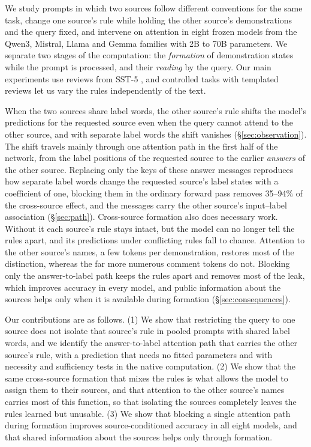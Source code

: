\documentclass[11pt]{article}
\newcommand{\nmodels}{eight}
\begin{document}
We study prompts in which two sources follow different conventions for the same task, change one source's rule while holding the other source's demonstrations and the query fixed, and intervene on attention in \nmodels{} frozen models from the Qwen3, Mistral, Llama and Gemma families with 2B to 70B parameters.
We separate two stages of the computation: the \emph{formation} of demonstration states while the prompt is processed, and their \emph{reading} by the query.
Our main experiments use reviews from SST-5 \citep{socher-etal-2013-recursive}, and controlled tasks with templated reviews let us vary the rules independently of the text.

When the two sources share label words, the other source's rule shifts the model's predictions for the requested source even when the query cannot attend to the other source, and with separate label words the shift vanishes (\S\ref{sec:observation}).
The shift travels mainly through one attention path in the first half of the network, from the label positions of the requested source to the earlier \emph{answers} of the other source.
Replacing only the keys of these answer messages reproduces how separate label words change the requested source's label states with a coefficient of one, blocking them in the ordinary forward pass removes 35--94\% of the cross-source effect, and the messages carry the other source's input--label association (\S\ref{sec:path}).
Cross-source formation also does necessary work.
Without it each source's rule stays intact, but the model can no longer tell the rules apart, and its predictions under conflicting rules fall to chance.
Attention to the other source's names, a few tokens per demonstration, restores most of the distinction, whereas the far more numerous comment tokens do not.
Blocking only the answer-to-label path keeps the rules apart and removes most of the leak, which improves accuracy in every model, and public information about the sources helps only when it is available during formation (\S\ref{sec:consequences}).

Our contributions are as follows.
(1) We show that restricting the query to one source does not isolate that source's rule in pooled prompts with shared label words, and we identify the answer-to-label attention path that carries the other source's rule, with a prediction that needs no fitted parameters and with necessity and sufficiency tests in the native computation.
(2) We show that the same cross-source formation that mixes the rules is what allows the model to assign them to their sources, and that attention to the other source's names carries most of this function, so that isolating the sources completely leaves the rules learned but unusable.
(3) We show that blocking a single attention path during formation improves source-conditioned accuracy in all \nmodels{} models, and that shared information about the sources helps only through formation.
\end{document}
